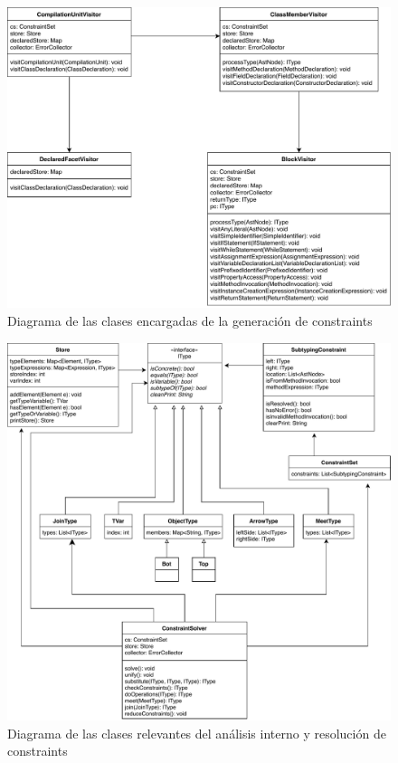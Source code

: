 \begin{figure}[ht]
  \includegraphics[width=\textwidth]{imagenes/visitors.pdf}
  \caption{Diagrama de las clases encargadas de la generación de constraints}
  \label{visitors}
\end{figure}
\clearpage
\begin{figure}[ht]
  \includegraphics[width=\textwidth]{imagenes/others.pdf}
  \caption{Diagrama de las clases relevantes del análisis interno y resolución de constraints}
  \label{others}
\end{figure}
\clearpage

